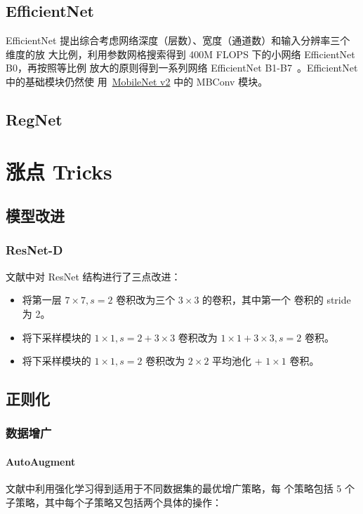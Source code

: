 \section{EfficientNet}
EfficientNet 提出综合考虑网络深度（层数）、宽度（通道数）和输入分辨率三个维度的放
大比例，利用参数网格搜索得到 400M FLOPS 下的小网络 EfficientNet B0，再按照等比例
放大的原则得到一系列网络 EfficientNet
B1-B7~\cite{2019-EfficientNet}。EfficientNet 中的基础模块仍然使
用~\hyperref[subsec:MobileNet-v2]{MobileNet v2} 中的 MBConv 模块。

\section{RegNet}

\chapter{涨点 Tricks}
\section{模型改进}
\subsection{ResNet-D}
文献中对 ResNet 结构进行了三点改进：
\begin{itemize}
  \item 将第一层 $7 \times 7, s=2$ 卷积改为三个 $3 \times 3$ 的卷积，其中第一个
    卷积的 stride 为 2。
  \item 将下采样模块的 $1 \times 1, s=2 + 3 \times 3$ 卷积改为 $1 \times 1 + 3
    \times 3, s=2$ 卷积。
  \item 将下采样模块的 $1 \times 1, s=2$ 卷积改为 $2 \times 2$ 平均池化 + $1
    \times 1$ 卷积。
\end{itemize}

\section{正则化}
\subsection{数据增广}
\subsubsection{AutoAugment}
文献中利用强化学习得到适用于不同数据集的最优增广策略，每
个策略包括 5 个子策略，其中每个子策略又包括两个具体的操作：

